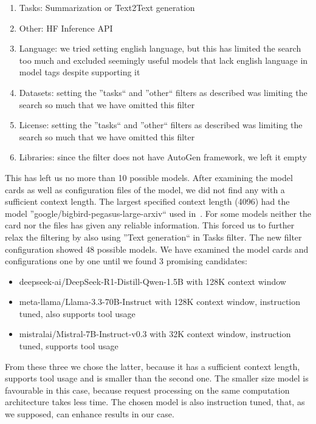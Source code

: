 \begin{enumerate}
	\item Tasks: Summarization or Text2Text generation
	\item Other: HF Inference API
	\item Language: we tried setting english language, but this has limited the search too much and excluded seemingly useful models that lack english language in model tags despite supporting it
	\item Datasets: setting the ''tasks`` and ''other`` filters as described was limiting the search so much that we have omitted this filter
	\item License: setting the ''tasks`` and ''other`` filters as described was limiting the search so much that we have omitted this filter
	\item Libraries: since the filter does not have AutoGen framework, we left it empty
\end{enumerate}

This has left us no more than 10 possible models. After examining the model cards as well as configuration files of the model, we did not find any with a sufficient context length. The largest specified context length (4096) had the model ''google/bigbird-pegasus-large-arxiv`` used in~\cite{zaheer2021big}. For some models neither the card nor the files has given any reliable information. This forced us to further relax the filtering by also using ''Text generation`` in Tasks filter. The new filter configuration showed 48 possible models. We have examined the model cards and configurations one by one until we found 3 promising candidates:

\begin{itemize}
	\item deepseek-ai/DeepSeek-R1-Distill-Qwen-1.5B with 128K context window
	\item meta-llama/Llama-3.3-70B-Instruct with 128K context window, instruction tuned, also supports tool usage
	\item mistralai/Mistral-7B-Instruct-v0.3 with 32K context window, instruction tuned, supports tool usage
\end{itemize}

From these three we chose the latter, because it has a sufficient context length, supports tool usage and is smaller than the second one. The smaller size model is favourable in this case, because request processing on the same computation architecture takes less time. The chosen model is also instruction tuned, that, as we supposed, can enhance results in our case.

